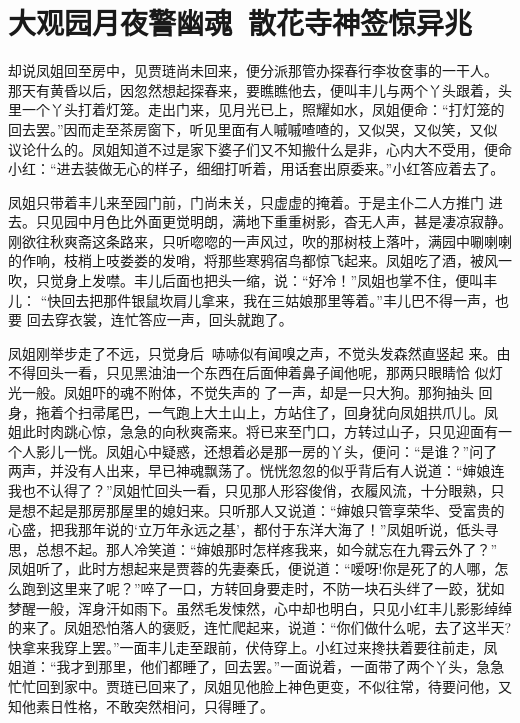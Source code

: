 \chapter{大观园月夜警幽魂~散花寺神签惊异兆}

却说凤姐回至房中，见贾琏尚未回来，便分派那管办探春行李妆奁事的一干人。
那天有黄昏以后，因忽然想起探春来，要瞧瞧他去，便叫丰儿与两个丫头跟着，头
里一个丫头打着灯笼。走出门来，见月光已上，照耀如水，凤姐便命：“打灯笼的
回去罢。”因而走至茶房窗下，听见里面有人嘁嘁喳喳的，又似哭，又似笑，又似
议论什么的。凤姐知道不过是家下婆子们又不知搬什么是非，心内大不受用，便命
小红：“进去装做无心的样子，细细打听着，用话套出原委来。”小红答应着去了。

凤姐只带着丰儿来至园门前，门尚未关，只虚虚的掩着。于是主仆二人方推门
进去。只见园中月色比外面更觉明朗，满地下重重树影，杳无人声，甚是凄凉寂静。
刚欲往秋爽斋这条路来，只听唿唿的一声风过，吹的那树枝上落叶，满园中唰喇喇
的作响，枝梢上吱娄娄的发哨，将那些寒鸦宿鸟都惊飞起来。凤姐吃了酒，被风一
吹，只觉身上发噤。丰儿后面也把头一缩，说：“好冷！”凤姐也掌不住，便叫丰儿：
“快回去把那件银鼠坎肩儿拿来，我在三姑娘那里等着。”丰儿巴不得一声，也要
回去穿衣裳，连忙答应一声，回头就跑了。

凤姐刚举步走了不远，只觉身后哧哧似有闻嗅之声，不觉头发森然直竖起
来。由不得回头一看，只见黑油油一个东西在后面伸着鼻子闻他呢，那两只眼睛恰
似灯光一般。凤姐吓的魂不附体，不觉失声的了一声，却是一只大狗。那狗抽头
回身，拖着个扫帚尾巴，一气跑上大土山上，方站住了，回身犹向凤姐拱爪儿。凤
姐此时肉跳心惊，急急的向秋爽斋来。将已来至门口，方转过山子，只见迎面有一
个人影儿一恍。凤姐心中疑惑，还想着必是那一房的丫头，便问：“是谁？”问了
两声，并没有人出来，早已神魂飘荡了。恍恍忽忽的似乎背后有人说道：“婶娘连
我也不认得了？”凤姐忙回头一看，只见那人形容俊俏，衣履风流，十分眼熟，只
是想不起是那房那屋里的媳妇来。只听那人又说道：“婶娘只管享荣华、受富贵的
心盛，把我那年说的‘立万年永远之基’，都付于东洋大海了！”凤姐听说，低头寻
思，总想不起。那人冷笑道：“婶娘那时怎样疼我来，如今就忘在九霄云外了？”
凤姐听了，此时方想起来是贾蓉的先妻秦氏，便说道：“嗳呀!你是死了的人哪，怎
么跑到这里来了呢？”啐了一口，方转回身要走时，不防一块石头绊了一跤，犹如
梦醒一般，浑身汗如雨下。虽然毛发悚然，心中却也明白，只见小红丰儿影影绰绰
的来了。凤姐恐怕落人的褒贬，连忙爬起来，说道：“你们做什么呢，去了这半天?
快拿来我穿上罢。”一面丰儿走至跟前，伏侍穿上。小红过来搀扶着要往前走，凤
姐道：“我才到那里，他们都睡了，回去罢。”一面说着，一面带了两个丫头，急急
忙忙回到家中。贾琏已回来了，凤姐见他脸上神色更变，不似往常，待要问他，又
知他素日性格，不敢突然相问，只得睡了。

